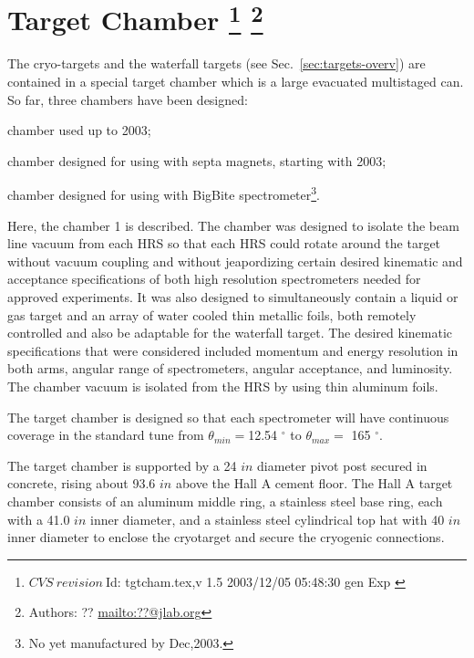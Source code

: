 \chapter[Target Chamber]{Target Chamber
\footnote{
  $CVS~revision~ $Id: tgtcham.tex,v 1.5 2003/12/05 05:48:30 gen Exp $ $
}
\footnote{Authors: ?? \url{mailto:??@jlab.org}}
}
\label{sec:target_chamb}

The cryo-targets and the waterfall targets 
(see Sec.~\ref{sec:targets-overv}) 
are contained in a special target chamber which is a large 
evacuated  multistaged can. So far, three chambers have been designed:
\begin{list}{.~}{\setlength{\itemsep}{-0.15cm}}
  \item chamber used up to 2003;
  \item chamber designed for using with septa magnets, starting with 2003;
  \item chamber designed for using with BigBite spectrometer\footnote{
        No yet manufactured by Dec,2003.}.
\end{list}

Here, the chamber 1 is described.
The chamber was designed to isolate the beam line vacuum from  each
HRS so that each HRS could rotate
around the target without vacuum coupling and without jeapordizing
certain desired kinematic and acceptance  specifications of 
both high resolution spectrometers
needed for approved experiments.  It  was also designed to simultaneously
 contain a liquid or gas target and an array of water cooled thin
 metallic foils, both remotely controlled and also be adaptable for
the waterfall target. The desired kinematic specifications that were
 considered included momentum and energy resolution in both arms,
 angular range of spectrometers, angular acceptance, and luminosity.
The chamber vacuum is isolated from the  HRS by using thin aluminum foils. 

The target chamber is designed so that
each spectrometer will have continuous coverage in the standard tune from
$\theta_{min}=$12.54 $^\circ$ to $\theta_{max}=$ 165 $^\circ$.

The target chamber is supported by a 24 $in$ diameter pivot post
secured in concrete, rising about 93.6 $in$ above the Hall A cement floor.
The Hall A target chamber
consists of an aluminum middle ring, a stainless steel base ring,
each with a 41.0 $in$ inner diameter,
and a stainless steel cylindrical top hat with 40 $in$ inner diameter
to enclose the cryotarget and secure the cryogenic connections.

